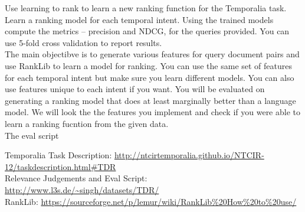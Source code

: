 \newcommand{\REM}[1]{}







\begin{hwproblem}

Use learning to rank to learn a new ranking function for the Temporalia task. Learn a ranking model for each temporal intent. Using the trained models compute the metrics -- precision and NDCG, for the queries provided. You can use 5-fold cross validation to report results.
\\ 
The main objectibve is to generate various features for query document pairs and use RankLib to learn a model for ranking. You can use the same set of features for each temporal intent but make sure you learn different models. You can also use features unique to each intent if you want. You will be evaluated on generating a ranking model that does at least marginally better than a language model. We will look the the features you implement and check if you were able to learn a ranking fucntion from the given data.
\\
The eval script

Temporalia Task Description: \url{http://ntcirtemporalia.github.io/NTCIR-12/taskdescription.html#TDR}
\\
Relevance Judgements and Eval Script: \url{http://www.l3s.de/~singh/datasets/TDR/}
 \\
RankLib: \url{https://sourceforge.net/p/lemur/wiki/RankLib%20How%20to%20use/}
 
\hwsolution{

}

\end{hwproblem}





